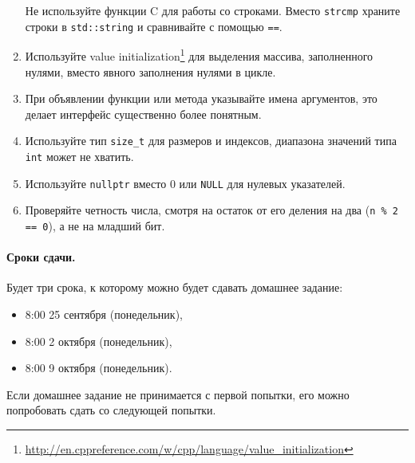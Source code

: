 \documentclass[a4paper,10pt]{article}
\begin{document}
\begin{enumerate}
    Не используйте функции C для работы со строками.
    Вместо {\tt strcmp} храните строки в {\tt std::string} и сравнивайте с помощью {\tt ==}.
    \item Используйте value initialization\footnote{\url{http://en.cppreference.com/w/cpp/language/value_initialization}}
    для выделения массива, заполненного нулями,
    вместо явного заполнения нулями в цикле.
    \item При объявлении функции или метода указывайте имена аргументов,
    это делает интерфейс существенно более понятным.
    \item Используйте тип {\tt size_t} для размеров и индексов,
    диапазона значений типа {\tt int} может не хватить.
    \item Используйте {\tt nullptr} вместо {0} или {\tt NULL} для нулевых указателей.
    \item Проверяйте четность числа, смотря на остаток от его деления на два
    ({\tt n \% 2 == 0}), а не на младший бит.
\end{enumerate}

\paragraph{Сроки сдачи.}
Будет три срока, к которому можно будет сдавать домашнее задание:
\begin{itemize}
    \item 8:00 25 сентября (понедельник),
    \item 8:00 2 октября (понедельник),
    \item 8:00 9 октября (понедельник).
\end{itemize}
Если домашнее задание не принимается с первой попытки, его
можно попробовать сдать со следующей попытки.
\end{document}
